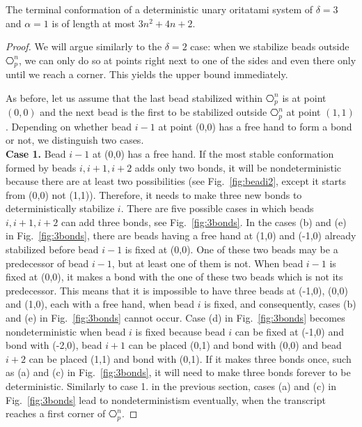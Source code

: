 \begin{lemma}[$\delta=3, \alpha =1$]\label{lem:d3a1}
	The terminal conformation of a deterministic unary oritatami system of $\delta=3$ and $\alpha = 1$ is of length at most $3n^2+4n+2$.
\end{lemma}
\begin{proof}
We will argue similarly to the $\delta=2$ case: when we stabilize beads outside $\hexagon_p^n$, we can only do so at points right next to one of the sides and even there only until we reach a corner. This yields the upper bound immediately.

As before, let us assume that the last bead stabilized within $\hexagon_p^n$ is at point $(0,0)$ and the next bead is the first to be stabilized outside $\hexagon_p^n$ at point $(1,1)$. Depending on whether bead $i-1$ at point (0,0) has a free hand to form a bond or not, we distinguish two cases.\\
\noindent\textbf{Case 1.}  Bead $i-1$ at (0,0) has a free hand. If the most stable conformation formed by beads $i, i+1, i+2$ adds only two  bonds, it will be nondeterministic because there are at least two possibilities (see Fig.~\ref{fig:beadi2}, except it starts from (0,0) not (1,1)). Therefore, it needs to make three new bonds to deterministically stabilize $i$. There are five possible cases in which beads $i, i+1, i+2$ can add three bonds, see Fig.~\ref{fig:3bonds}. In the cases (b) and (e) in Fig.~\ref{fig:3bonds}, there are beads having a free hand at (1,0) and (-1,0) already stabilized before bead $i-1$ is fixed at (0,0). One of these two beads may be a predecessor of bead $i-1$, but at least one of them is not. When bead $i-1$ is fixed at (0,0), it makes a bond with the one of these two beads which is not its predecessor. This means that it is impossible to have three beads at (-1,0), (0,0) and (1,0), each with a free hand, when bead $i$ is fixed, and consequently, cases (b) and (e) in Fig.~\ref{fig:3bonds} cannot occur. Case (d) in Fig.~\ref{fig:3bonds} becomes nondeterministic when bead $i$ is fixed because bead $i$ can be fixed at (-1,0) and bond with (-2,0), bead $i+1$ can be placed (0,1) and bond with (0,0) and bead $i+2$ can be placed (1,1) and bond with (0,1). If it makes three bonds once, such as (a) and (c) in Fig.~\ref{fig:3bonds}, it will need to make three bonds forever to be deterministic. Similarly to case 1. in the previous section, cases (a) and (c) in Fig.~\ref{fig:3bonds} lead to nondeterministism eventually, when the transcript reaches a first corner of $\hexagon_p^n$.


\end{proof}
